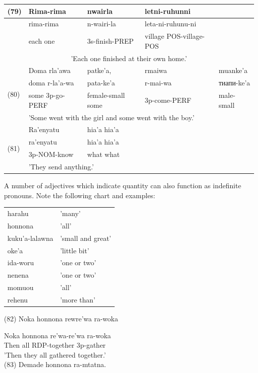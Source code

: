 \documentclass[10pt]{article}
\begin{document}
\begin{center}
\begin{tabular}{|l|l|l|l|l|}
\hline
(79) & Rima-rima & nwairla & letni-ruhunni & \multirow{3}{*}{} \\
\hline
 & rima-rima & n-wairi-la & leta-ni-ruhunu-ni &  \\
\hline
 & each one & 3s-finish-PREP & village POS-village-POS &  \\
\hline
\multicolumn{5}{|c|}{'Each one finished at their own home.'} \\
\hline
\multirow[t]{4}{*}{(80)} & Doma rla'awa & patke'a, & rmaiwa & muanke'a \\
\hline
 & doma r-la'a-wa & pata-ke'a & r-mai-wa & тиапи-ke'a \\
\hline
 & some 3p-go-PERF & female-small some & 3p-come-PERF & male-small \\
\hline
 & \multicolumn{4}{|l|}{'Some went with the girl and some went with the boy.'} \\
\hline
\multirow[t]{4}{*}{(81)} & Ra'enyatu & hia'a hia'a &  &  \\
\hline
 & ra'enyatu & hia'a hia'a &  &  \\
\hline
 & 3p-NOM-know & what what &  &  \\
\hline
 & \multicolumn{4}{|l|}{'They send anything.'} \\
\hline
\end{tabular}
\end{center}

A number of adjectives which indicate quantity can also function as indefinite pronouns. Note the following chart and examples:

\begin{center}
\begin{tabular}{ll}
harahu & 'many' \\
honnona & 'all' \\
kuku'a-lalawna & 'small and great' \\
oke'a & 'little bit' \\
ida-woru & 'one or two' \\
nenena & 'one or two' \\
momuou & 'all' \\
rehenu & 'more than' \\
\end{tabular}
\end{center}

(82) Noka honnona rewre'wa ra-woka

Noka honnona re'wa-re'wa ra-woka\\
Then all RDP-together 3p-gather\\
'Then they all gathered together.'\\
(83) Demade honnona ra-mtatna.
\end{document}
